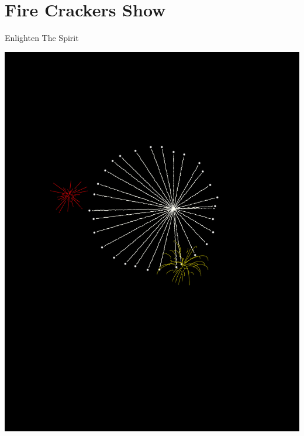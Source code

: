 \documentclass[makeidx, 11pt, oneside, onecolumn, openright, final, svgnames, dvipsnames, extrafontsizes]{memoir}
\begin{document}
\chapter{Fire Crackers Show}
\thispagestyle{empty}
\begin{center}
Enlighten The Spirit
\end{center}
\begin{center}
\includegraphics[scale=1]{fire.jpeg}
\end{center}
\end{document}
